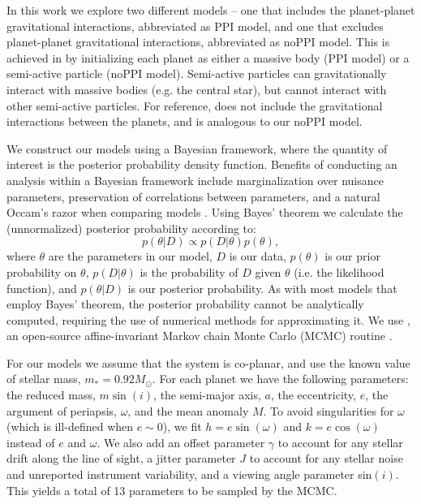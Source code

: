 In this work we explore two different models -- one that includes the planet-planet gravitational interactions, abbreviated as PPI model, and one that excludes planet-planet gravitational interactions, abbreviated as noPPI model. 
This is achieved in \reb by initializing each planet as either a massive body (PPI model) or a semi-active particle (noPPI model).
Semi-active particles can gravitationally interact with massive bodies (e.g. the central star), but cannot interact with other semi-active particles. 
For reference, \R does not include the gravitational interactions between the planets, and is analogous to our noPPI model.  

We construct our models using a Bayesian framework, where the quantity of interest is the posterior probability density function. 
Benefits of conducting an analysis within a Bayesian framework include marginalization over nuisance parameters, preservation of correlations between parameters, and a natural Occam's razor when comparing models \citep[see e.g.][for a full discussion]{Gregory2005}.
Using Bayes' theorem we calculate the (unnormalized) posterior probability according to:
\begin{equation*}
p(\theta | D) \propto p(D | \theta) p(\theta),
\label{eq:Bayes}
\end{equation*}
where $\theta$ are the parameters in our model, $D$ is our data, $p(\theta)$ is our prior probability on $\theta$, $p(D | \theta)$ is the probability of $D$ given $\theta$ (i.e. the likelihood function), and $p(\theta | D)$ is our posterior probability.
As with most models that employ Bayes' theorem, the posterior probability cannot be analytically computed, requiring the use of numerical methods for approximating it. 
We use \emcee, an open-source affine-invariant Markov chain Monte Carlo (MCMC) routine  \citep{Foreman-Mackey2013}.  

For our models we assume that the system is co-planar, and use the known value of stellar mass, $m_* = 0.92M_{\odot}$.
For each planet we have the following parameters: the reduced mass, $m\sin(i)$, the semi-major axis, $a$, the eccentricity, $e$, the argument of periapsis, $\omega$, and the mean anomaly $M$. 
To avoid singularities for $\omega$ (which is ill-defined when $e\sim0$), we fit $h=e\sin(\omega)$ and $k=e\cos(\omega)$ instead of $e$ and $\omega$.
We also add an offset parameter $\gamma$ to account for any stellar drift along the line of sight, a jitter parameter $J$ to account for any stellar noise and unreported instrument variability, and a viewing angle parameter sin$(i)$.
This yields a total of 13 parameters to be sampled by the MCMC. 

